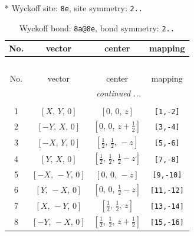 \documentclass[fleqn,8pt]{jsarticle}
\begin{document}
* Wyckoff site: {\tt 8e}, site symmetry: {\tt 2..}
\renewcommand{\arraystretch}{1.2}
\begin{longtable}{cccc}
\caption{Wyckoff bond: {\tt 8a@8e}, bond symmetry: {\tt 2..}}
 \\
 \hline \hline
No. & vector & center & mapping \\ \hline \endfirsthead

\multicolumn{3}{l}{\tablename\ \thetable{}} \\
 \hline \hline
No. & vector & center & mapping \\ \hline \endhead

 \hline \hline
\multicolumn{3}{r}{\footnotesize\it continued ...} \\ \endfoot

 \hline \hline
\multicolumn{3}{r}{} \\ \endlastfoot

1 & $\left[ X,\, Y,\, 0 \right]$ & $\left[ 0,\, 0,\, z \right]$ & {\tt [1,-2]} \\ \hline
2 & $\left[ - Y,\, X,\, 0 \right]$ & $\left[ 0,\, 0,\, z + \frac{1}{2} \right]$ & {\tt [3,-4]} \\ \hline
3 & $\left[ - X,\, Y,\, 0 \right]$ & $\left[ \frac{1}{2},\, \frac{1}{2},\, - z \right]$ & {\tt [5,-6]} \\ \hline
4 & $\left[ Y,\, X,\, 0 \right]$ & $\left[ \frac{1}{2},\, \frac{1}{2},\, \frac{1}{2} - z \right]$ & {\tt [7,-8]} \\ \hline
5 & $\left[ - X,\, - Y,\, 0 \right]$ & $\left[ 0,\, 0,\, - z \right]$ & {\tt [9,-10]} \\ \hline
6 & $\left[ Y,\, - X,\, 0 \right]$ & $\left[ 0,\, 0,\, \frac{1}{2} - z \right]$ & {\tt [11,-12]} \\ \hline
7 & $\left[ X,\, - Y,\, 0 \right]$ & $\left[ \frac{1}{2},\, \frac{1}{2},\, z \right]$ & {\tt [13,-14]} \\ \hline
8 & $\left[ - Y,\, - X,\, 0 \right]$ & $\left[ \frac{1}{2},\, \frac{1}{2},\, z + \frac{1}{2} \right]$ & {\tt [15,-16]} \\
\end{longtable}
\renewcommand{\arraystretch}{1.2}
\end{document}
